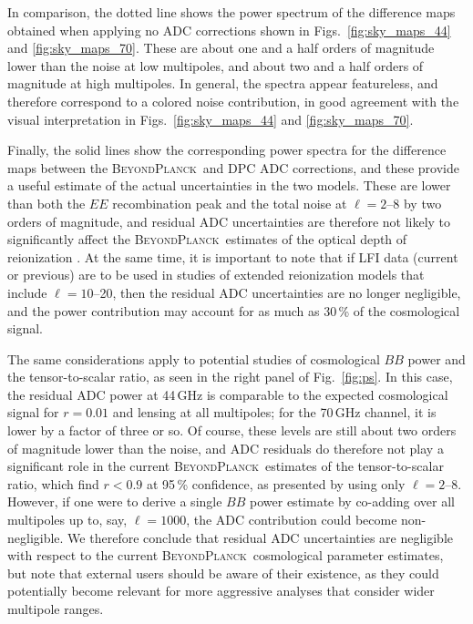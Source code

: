 \documentclass[twocolumn]{aa}
\newcommand{\BP}{\textsc{BeyondPlanck}}
\begin{document}
In comparison, the dotted line shows the power spectrum of the difference maps obtained when applying no ADC corrections shown in Figs.~\ref{fig:sky_maps_44} and \ref{fig:sky_maps_70}. These are about one and a half orders of magnitude lower than the noise at low multipoles, and about two and a half orders of magnitude at high multipoles. In general, the spectra appear featureless, and therefore correspond to a colored noise contribution, in good agreement with the visual interpretation in Figs.~\ref{fig:sky_maps_44} and \ref{fig:sky_maps_70}.

Finally, the solid lines show the corresponding power spectra for the difference maps between the \BP\ and DPC ADC corrections, and these provide a useful estimate of the actual uncertainties in the two models. These are lower than both the $EE$ recombination peak and the total noise at $\ell=2$--8 by two orders of magnitude, and residual ADC uncertainties are therefore not likely to significantly affect the \BP\ estimates of the optical depth of reionization \citep{bp12}. At the same time, it is important to note that if LFI data (current or previous) are to be used in studies of extended reionization models that include $\ell=10$--20, then the residual ADC uncertainties are no longer negligible, and the power contribution may account for as much as 30\,\% of the cosmological signal.

The same considerations apply to potential studies of cosmological $BB$ power and the tensor-to-scalar ratio, as seen in the right panel of Fig.~\ref{fig:ps}. In this case, the residual ADC power at 44\,GHz is comparable to the expected cosmological signal for $r=0.01$ and lensing at all multipoles; for the 70\,GHz channel, it is lower by a factor of three or so. Of course, these levels are still about two orders of magnitude lower than the noise, and ADC residuals do therefore not play a significant role in the current \BP\ estimates of the tensor-to-scalar ratio, which find $r<0.9$ at 95\,\% confidence, as presented by \citet{bp12} using only $\ell=2$--8. However, if one were to derive a single $BB$ power estimate by co-adding over all multipoles up to, say, $\ell=1000$, the ADC contribution could become non-negligible. We therefore conclude that residual ADC uncertainties are negligible with respect to the current \BP\ cosmological parameter estimates, but note that external users should be aware of their existence, as they could potentially become relevant for more aggressive analyses that consider wider multipole ranges.
\end{document}
